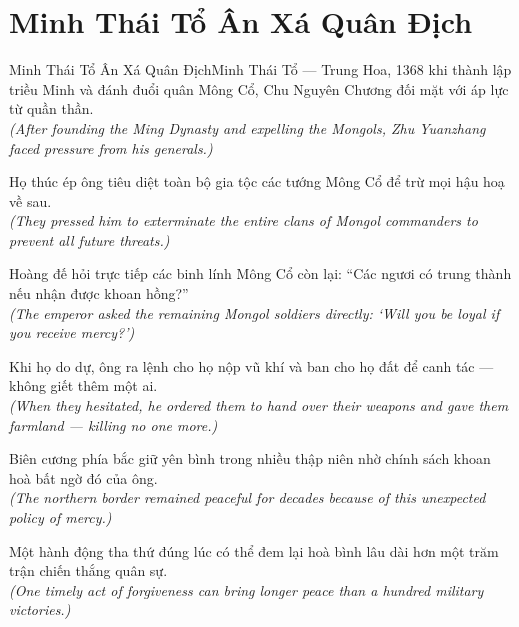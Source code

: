 \section{Minh Thái Tổ Ân Xá Quân Địch}
\begin{truyen}{Minh Thái Tổ Ân Xá Quân Địch}{Minh Thái Tổ --- Trung Hoa, 1368}
 khi thành lập triều Minh và đánh đuổi quân Mông Cổ, Chu Nguyên Chương đối mặt với áp lực từ quần thần.\\[4pt]
\textit{(After founding the Ming Dynasty and expelling the Mongols, Zhu Yuanzhang faced pressure from his generals.)}

Họ thúc ép ông tiêu diệt toàn bộ gia tộc các tướng Mông Cổ để trừ mọi hậu hoạ về sau.\\[4pt]
\textit{(They pressed him to exterminate the entire clans of Mongol commanders to prevent all future threats.)}

Hoàng đế hỏi trực tiếp các binh lính Mông Cổ còn lại: ``Các ngươi có trung thành nếu nhận được khoan hồng?''\\[4pt]
\textit{(The emperor asked the remaining Mongol soldiers directly: `Will you be loyal if you receive mercy?')}

Khi họ do dự, ông ra lệnh cho họ nộp vũ khí và ban cho họ đất để canh tác --- không giết thêm một ai.\\[4pt]
\textit{(When they hesitated, he ordered them to hand over their weapons and gave them farmland --- killing no one more.)}

Biên cương phía bắc giữ yên bình trong nhiều thập niên nhờ chính sách khoan hoà bất ngờ đó của ông.\\[4pt]
\textit{(The northern border remained peaceful for decades because of this unexpected policy of mercy.)}

\end{truyen}
\begin{baihoc}
  Một hành động tha thứ đúng lúc có thể đem lại hoà bình lâu dài hơn một trăm trận chiến thắng quân sự.\\[4pt]
  \textit{(One timely act of forgiveness can bring longer peace than a hundred military victories.)}
\end{baihoc}

